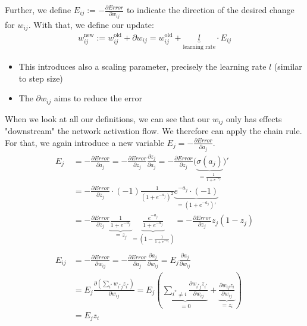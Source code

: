 Further, we define $E_{ij} := -\frac{\partial Error}{\partial w_{ij}}$ to indicate the direction of the desired change for $w_{ij}$. With that, we define our update:
\begin{align*}
  w_{ij}^{\text{new}} := w_{ij}^{\text{old}} + \partial w_{ij} = w_{ij}^{\text{old}} + \underbrace{l}_{\text{learning rate}}\cdot E_{ij}
\end{align*}
\begin{itemize}
  \item This introduces also a scaling parameter, precisely the learning rate $l$ (similar to step size)
  \item The $\partial w_{ij}$ aims to reduce the error
\end{itemize}

When we look at all our definitions, we can see that our $w_{ij}$ only has effects "downstream" the network activation flow. We therefore can apply the chain rule. For that, we again introduce a new variable $E_j = -\frac{\partial Error}{\partial a_j}$.
\begin{align*}
  E_j &= -\frac{\partial Error}{\partial a_j} = -\frac{\partial Error}{\partial z_j}\frac{\partial z_j}{\partial a_j} = -\frac{\partial Error}{\partial z_j} \big(\underbrace{\sigma(a_j)}_{= \frac{1}{1+e^{-a_j}}}\big)'\\
  &= -\frac{\partial Error}{\partial z_j} \cdot (-1)\frac{1}{(1+e^{-a_j})^2}\underbrace{e^{-a_j}\cdot(-1)}_{= (1+e^{-a_j})'} \\
  &= -\frac{\partial Error}{\partial z_j} \underbrace{\frac{1}{1+e^{-a_j}}}_{=z_j}\underbrace{\frac{e^{-a_j}}{1+e^{-a_j}}}_{=\left(1-\frac{1}{1+e^{-a_j}}\right)} = -\frac{\partial Error}{\partial z_j} z_j (1-z_j)\\\\
  E_{ij} &= -\frac{\partial Error}{\partial w_{ij}} = -\frac{\partial Error}{\partial a_j}\frac{\partial a_j}{\partial w_{ij}} = E_j \frac{\partial a_j}{\partial w_{ij}}\\
  &= E_j \frac{\partial (\sum_{i^*} w_{i^*j}z_{i^*})}{\partial w_{ij}} = E_j \left(\underbrace{\sum_{i^*\neq i}\frac{\partial w_{i^*j}z_{i^*}}{\partial w_{ij}}}_{=0} + \underbrace{\frac{\partial w_{ij}z_i}{\partial w_{ij}}}_{=z_i}\right)\\
  &= E_j z_i
\end{align*}

